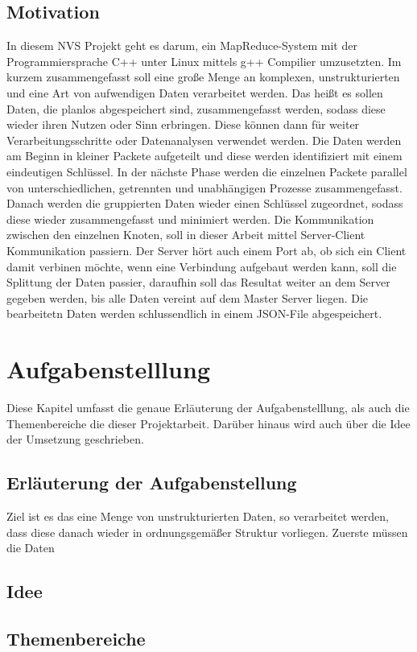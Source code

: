 \documentclass[a4paper,12pt]{article}
\begin{document}
\subsection{Motivation}
In diesem NVS Projekt geht es darum, ein MapReduce-System mit der Programmiersprache C++ unter Linux mittels g++ Compilier umzusetzten.
Im kurzem zusammengefasst soll eine große Menge an komplexen, unstrukturierten und eine Art von aufwendigen Daten verarbeitet werden. 
Das heißt es sollen Daten, die planlos abgespeichert sind, zusammengefasst werden, sodass diese wieder ihren Nutzen oder Sinn erbringen. Diese können
dann für weiter Verarbeitungsschritte oder Datenanalysen verwendet werden. Die Daten werden am Beginn in kleiner Packete aufgeteilt und diese werden identifiziert mit einem eindeutigen
Schlüssel. In der nächste Phase werden die einzelnen Packete parallel von unterschiedlichen, getrennten und unabhängigen Prozesse zusammengefasst. Danach werden die gruppierten Daten wieder 
einen Schlüssel zugeordnet, sodass diese wieder zusammengefasst und minimiert werden. Die Kommunikation zwischen den einzelnen Knoten, soll in dieser Arbeit mittel Server-Client Kommunikation passiern.
Der Server hört auch einem Port ab, ob sich ein Client damit verbinen möchte, wenn eine Verbindung aufgebaut werden kann, soll die Splittung der Daten passier, daraufhin soll das Resultat weiter an dem Server gegeben werden, bis 
alle Daten vereint auf dem Master Server liegen. Die bearbeitetn Daten werden schlussendlich in einem JSON-File abgespeichert.
\section{Aufgabenstelllung}
Diese Kapitel umfasst die genaue Erläuterung der Aufgabenstelllung, als auch die Themenbereiche die dieser Projektarbeit. Darüber hinaus wird auch über die Idee der Umsetzung geschrieben.

\subsection{Erläuterung der Aufgabenstellung}
Ziel ist es das eine Menge von unstrukturierten Daten, so verarbeitet werden, dass diese danach wieder in ordnungsgemäßer Struktur vorliegen. Zuerste müssen die Daten 

\subsection{Idee}

\subsection{Themenbereiche}
\newpage
\end{document}
